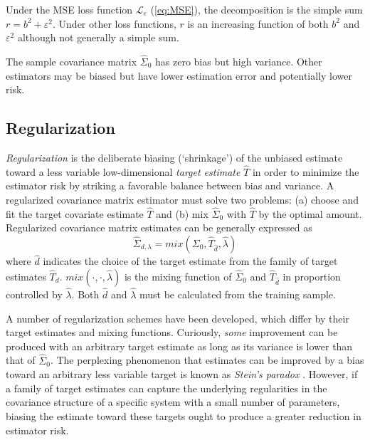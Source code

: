 Under the MSE loss function $\mathcal L_e$ (\autoref{eq:MSE}), the decomposition is the simple sum $r = b^2 + \varepsilon^2$. 
Under other loss functions, $r$ is an increasing function of both $b^2$ and $\varepsilon^2$ although not generally a simple sum.  

The sample covariance matrix $\hat\Sigma_0$ has zero bias but high variance. Other estimators may be biased but have lower estimation error and potentially lower risk.


\subsection{Regularization}

\emph{Regularization} is the deliberate biasing (`shrinkage') of the unbiased estimate toward a less variable low-dimensional \emph{target estimate} $\hat T$ in order to minimize the estimator risk by striking a favorable balance between bias and variance.
A regularized covariance matrix estimator must solve two problems: (a) choose and fit the target covariate estimate $\hat T$ and (b) mix $\hat\Sigma_0$ with $\hat T$ by the optimal amount. 
Regularized covariance matrix estimates can be generally expressed as 
\begin{equation}
\hat\Sigma_{d,\lambda} = mix(\Sigma_0,\hat T_{\hat d},\hat\lambda) 
\end{equation}
where $\hat d$ indicates the choice of the target estimate from the family of target estimates $\hat T_d$. $mix(\cdot,\cdot,\hat\lambda)$ is the mixing function of $\hat\Sigma_0$ and $\hat T_{\hat d}$ in proportion controlled by $\hat \lambda$. Both $\hat d$ and $\hat \lambda$ must be calculated from the training sample. 

A number of regularization schemes have been developed, which differ by their target estimates and mixing functions.    Curiously, \emph{some} improvement can be produced with an arbitrary target estimate as long as its variance is lower than that of $\hat\Sigma_0$.  The perplexing phenomenon that estimates can be improved by a bias toward an arbitrary less variable target is known as \emph{Stein's paradox} \citep{Efron:1977}.    However, if a family of target estimates can capture the underlying regularities in the covariance structure of a specific system with a small number of parameters, biasing the estimate toward these targets ought to produce a greater reduction in estimator risk. 

